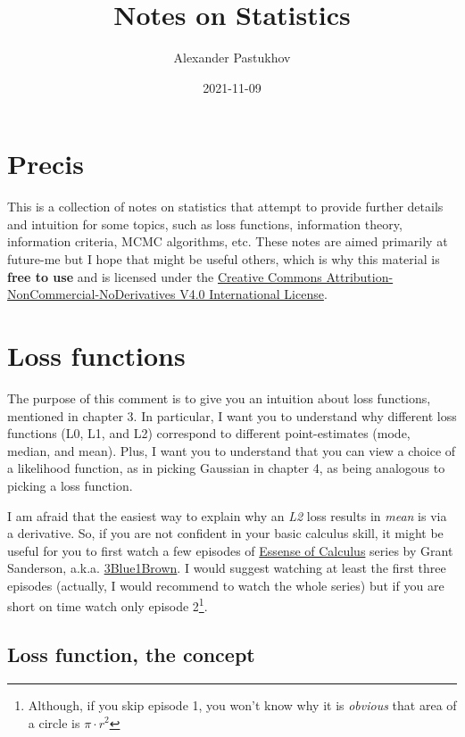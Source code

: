 \documentclass[
]{book}
\title{Notes on Statistics}
\author{Alexander Pastukhov}
\date{2021-11-09}
\begin{document}
\maketitle

{
\setcounter{tocdepth}{1}
\tableofcontents
}
\hypertarget{precis}{%
\chapter{Precis}\label{precis}}

This is a collection of notes on statistics that attempt to provide further details and intuition for some topics, such as loss functions, information theory, information criteria, MCMC algorithms, etc. These notes are aimed primarily at future-me but I hope that might be useful others, which is why this material is \textbf{free to use} and is licensed under the \href{https://creativecommons.org/licenses/by-nc-nd/4.0/}{Creative Commons Attribution-NonCommercial-NoDerivatives V4.0 International License}.

\hypertarget{loss-functions}{%
\chapter{Loss functions}\label{loss-functions}}

The purpose of this comment is to give you an intuition about loss functions, mentioned in chapter 3. In particular, I want you to understand why different loss functions (L0, L1, and L2) correspond to different point-estimates (mode, median, and mean). Plus, I want you to understand that you can view a choice of a likelihood function, as in picking Gaussian in chapter 4, as being analogous to picking a loss function.

I am afraid that the easiest way to explain why an \emph{L2} loss results in \emph{mean} is via a derivative. So, if you are not confident in your basic calculus skill, it might be useful for you to first watch a few episodes of \href{https://www.youtube.com/playlist?list=PLZHQObOWTQDMsr9K-rj53DwVRMYO3t5Yr}{Essense of Calculus} series by Grant Sanderson, a.k.a. \href{https://www.3blue1brown.com/}{3Blue1Brown}. I would suggest watching at least the first three episodes (actually, I would recommend to watch the whole series) but if you are short on time watch only episode 2\footnote{Although, if you skip episode 1, you won't know why it is \emph{obvious} that area of a circle is \(\pi\cdot r^2\)}.

\hypertarget{loss-function-the-concept}{%
\section{Loss function, the concept}\label{loss-function-the-concept}}
\end{document}
